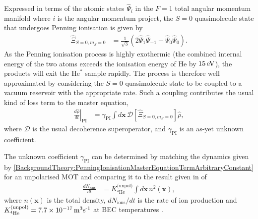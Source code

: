 Expressed in terms of the atomic states $\hat{\Psi}_i$ in the $F=1$ total angular momentum manifold where $i$ is the angular momentum project, the $S=0$ quasimolecule state that undergoes Penning ionisation is given by
\begin{align}
    \hat{\Xi}_{S=0, m_S=0} &= \frac{1}{\sqrt{3}} \left( 2 \hat{\Psi}_1 \hat{\Psi}_{-1} - \hat{\Psi}_0 \hat{\Psi}_0\right).
\end{align}
As the Penning ionisation process is highly exothermic (the combined internal energy of the two atoms exceeds the ionisation energy of $\text{He}$ by $\unit[15]{eV}$), the products will exit the $\text{He}^*$ sample rapidly. The process is therefore well approximated by considering the $S=0$ quasimolecule state to be coupled to a vacuum reservoir with the appropriate rate. Such a coupling contributes the usual kind of loss term to the master equation,
\begin{align}
    \label{BackgroundTheory:PenningIonisationMasterEquationTermArbitraryConstant}
    \left.\frac{d \hat{\rho}}{d t}\right|_\text{PI} &= \gamma_\text{PI} \int d \bm{x}\, \mathcal{D}\left[ \hat{\Xi}_{S=0, m_S=0}\right] \hat{\rho},
\end{align}
where $\mathcal{D}$ is the usual decoherence superoperator, and $\gamma_\text{PI}$ is an as-yet unknown coefficient.

The unknown coefficient $\gamma_\text{PI}$ can be determined by matching the dynamics given by \eqref{BackgroundTheory:PenningIonisationMasterEquationTermArbitraryConstant} for an unpolarised MOT and comparing it to the result given in \citep{Stas:2006kx} of
\begin{align}
    \frac{d N_\text{ions}}{d t} &= K^\text{(unpol)}_{^4\text{He}} \int d \bm{x}\, n^2(\bm{x}),
\end{align}
where $n(\bm{x})$ is the total density, $dN_\text{ions}/dt$ is the rate of ion production and $K^\text{(unpol)}_{^4\text{He}} = \unit[7.7 \times 10^{-17}]{m\textsuperscript{3}s\textsuperscript{-1}}$ at BEC temperatures \citep{Stas:2006kx}.

